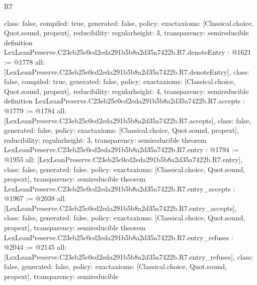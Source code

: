 \begin{lexlean}{R7}
\begin{coremodule}
{  class: false,
  compiled: true,
  generated: false,
  policy: exact{axioms: [Classical.choice, Quot.sound, propext]},
  reducibility: regular{height: 3},
  transparency: semireducible
}
definition LexLeanPreserve.C23eb25c0cd2eda291b5b8a2d35a7422b.R7.denoteEntry : @1621 := @1778 {
  all: [LexLeanPreserve.C23eb25c0cd2eda291b5b8a2d35a7422b.R7.denoteEntry],
  class: false,
  compiled: true,
  generated: false,
  policy: exact{axioms: [Classical.choice, Quot.sound, propext]},
  reducibility: regular{height: 4},
  transparency: semireducible
}
definition LexLeanPreserve.C23eb25c0cd2eda291b5b8a2d35a7422b.R7.accepts : @1779 := @1784 {
  all: [LexLeanPreserve.C23eb25c0cd2eda291b5b8a2d35a7422b.R7.accepts],
  class: false,
  generated: false,
  policy: exact{axioms: [Classical.choice, Quot.sound, propext]},
  reducibility: regular{height: 3},
  transparency: semireducible
}
theorem LexLeanPreserve.C23eb25c0cd2eda291b5b8a2d35a7422b.R7.entry : @1794 := @1955 {
  all: [LexLeanPreserve.C23eb25c0cd2eda291b5b8a2d35a7422b.R7.entry],
  class: false,
  generated: false,
  policy: exact{axioms: [Classical.choice, Quot.sound, propext]},
  transparency: semireducible
}
theorem LexLeanPreserve.C23eb25c0cd2eda291b5b8a2d35a7422b.R7.entry_accepts : @1967 := @2038 {
  all: [LexLeanPreserve.C23eb25c0cd2eda291b5b8a2d35a7422b.R7.entry_accepts],
  class: false,
  generated: false,
  policy: exact{axioms: [Classical.choice, Quot.sound, propext]},
  transparency: semireducible
}
theorem LexLeanPreserve.C23eb25c0cd2eda291b5b8a2d35a7422b.R7.entry_refuses : @2044 := @2145 {
  all: [LexLeanPreserve.C23eb25c0cd2eda291b5b8a2d35a7422b.R7.entry_refuses],
  class: false,
  generated: false,
  policy: exact{axioms: [Classical.choice, Quot.sound, propext]},
  transparency: semireducible
}


\end{coremodule}
\end{lexlean}
